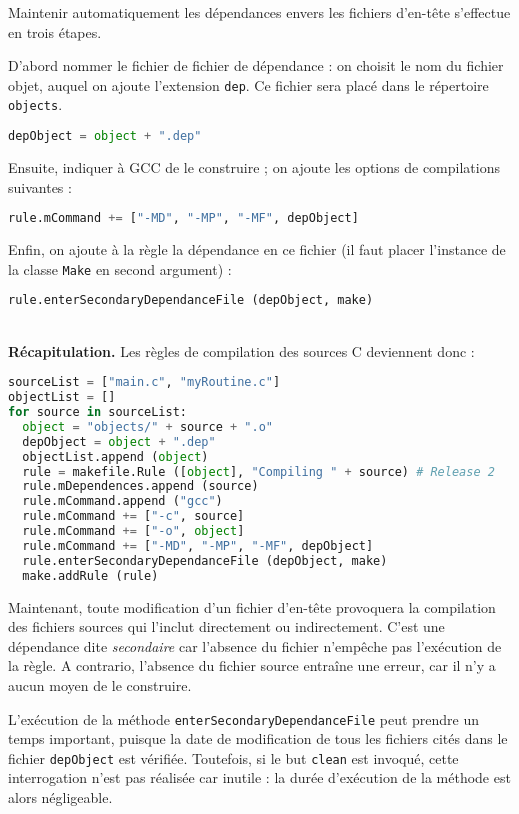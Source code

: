 \documentclass[a4paper,11pt]{extarticle}
\begin{document}
Maintenir automatiquement les dépendances envers les fichiers d'en-tête s'effectue en trois étapes.

D'abord nommer le fichier de fichier de dépendance : on choisit le nom du fichier objet, auquel on ajoute l'extension \texttt{dep}. Ce fichier sera placé dans le répertoire \texttt{objects}.
\begin{lstlisting}[language=py]
  depObject = object + ".dep"
\end{lstlisting}

Ensuite, indiquer à GCC de le construire ; on ajoute les options de compilations suivantes :
\begin{lstlisting}[language=py]
  rule.mCommand += ["-MD", "-MP", "-MF", depObject]
\end{lstlisting}

Enfin, on ajoute à la règle la dépendance en ce fichier (il faut placer l'instance de la classe \texttt{Make} en second argument) :
\begin{lstlisting}[language=py]
  rule.enterSecondaryDependanceFile (depObject, make)
\end{lstlisting}


~\\{\bf Récapitulation.} Les règles de compilation des sources C deviennent donc :
\begin{lstlisting}[language=py]
sourceList = ["main.c", "myRoutine.c"]
objectList = []
for source in sourceList:
  object = "objects/" + source + ".o"
  depObject = object + ".dep"
  objectList.append (object)
  rule = makefile.Rule ([object], "Compiling " + source) # Release 2
  rule.mDependences.append (source)
  rule.mCommand.append ("gcc")
  rule.mCommand += ["-c", source]
  rule.mCommand += ["-o", object]
  rule.mCommand += ["-MD", "-MP", "-MF", depObject]
  rule.enterSecondaryDependanceFile (depObject, make)
  make.addRule (rule)
\end{lstlisting}

Maintenant, toute modification d'un fichier d'en-tête provoquera la compilation des fichiers sources qui l'inclut directement ou indirectement. C'est une dépendance dite \emph{secondaire} car l'absence du fichier n'empêche pas l'exécution de la règle. A contrario, l'absence du fichier source entraîne une erreur, car il n'y a aucun moyen de le construire.

L'exécution de la méthode \texttt{enterSecondaryDependanceFile} peut prendre un temps important, puisque la date de modification de tous les fichiers cités dans le fichier \texttt{depObject} est vérifiée. Toutefois, si le but \texttt{clean} est invoqué, cette interrogation n'est pas réalisée car inutile : la durée d'exécution de la méthode est alors négligeable.
\end{document}
